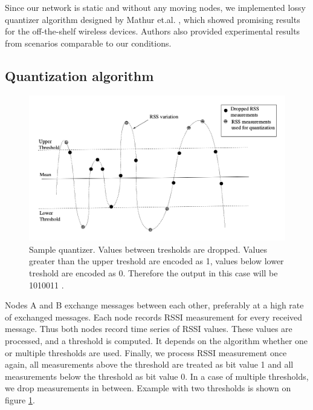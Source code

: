 \documentclass[
  print, %
  Table,   %
  nolof,     %
  nolot,     %
           oneside
]{fithesis3}
\begin{document}
    Since our network is static and without any moving nodes, we implemented lossy quantizer algorithm designed by Mathur et.al. \cite{Mathur2008Rssi}, which showed promising results for the off-the-shelf wireless devices. Authors also provided experimental results from scenarios comparable to our conditions.

    \subsection{Quantization algorithm}\label{subsec:quant}

    \begin{figure}[h!!]
      \begin{center}
        \includegraphics[width=\textwidth]{../images/quant_alg.png}
      \end{center}
      \caption{Sample quantizer. Values between tresholds are dropped. Values greater than the upper treshold are encoded as 1, values below lower treshold are encoded as 0. Therefore the output in this case will be 1010011 \cite{Jana2009Rssi}.}
      \label{fig:quant_alg}
    \end{figure}

    Nodes A and B exchange messages between each other, preferably at a high rate of exchanged messages. Each node records RSSI measurement for every received message. Thus both nodes record time series of RSSI values.     These values are processed, and a threshold is computed. It depends on the algorithm whether one or multiple thresholds are used. Finally, we process RSSI measurement once again, all measurements above the threshold are treated as bit value 1 and all measurements below the threshold as bit value 0. In a case of multiple thresholds, we drop measurements in between. Example with two thresholds is shown on figure \ref{fig:quant_alg}.
\end{document}
